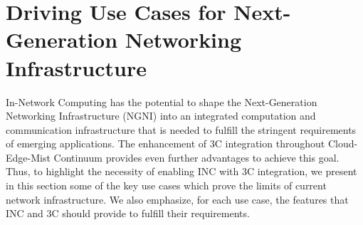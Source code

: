 \section{Driving Use Cases for Next-Generation Networking Infrastructure} \label{sec:UseCases}

\noindent In-Network Computing has the potential to shape the Next-Generation Networking Infrastructure (NGNI) into an integrated computation and communication infrastructure that is  needed  to fulfill the stringent requirements of emerging applications. The enhancement of 3C integration throughout Cloud-Edge-Mist Continuum provides even further advantages to achieve this goal. Thus, to highlight the necessity of enabling INC with 3C integration, we present in this section some of the key use cases which prove the limits of current network infrastructure. We also emphasize, for each use case, the features that INC and 3C should provide to fulfill their requirements.



